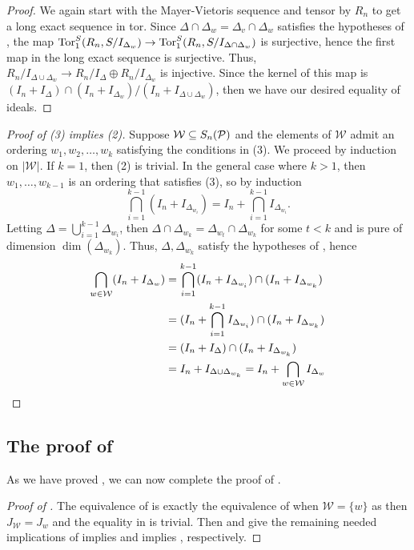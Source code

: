 \begin{proof}
    We again start with the Mayer-Vietoris sequence and tensor by $R_n$ to get a long exact sequence in tor.
    Since $\Delta\cap\Delta_w = \Delta_v\cap \Delta_w$ satisfies the hypotheses of , the map $\operatorname{Tor}_1^S(R_n,S/I_{\Delta_w})\to \operatorname{Tor}_1^S(R_n,S/I_{\Delta\cap\Delta_w})$ is surjective, hence the first map in the long exact sequence is surjective. Thus, $R_n/I_{\Delta\cup\Delta_w}\to R_n/I_\Delta \oplus R_n/I_{\Delta_w}$ is injective. Since the kernel of this map is $(I_n + I_\Delta)\cap (I_n+I_{\Delta_w})/(I_n + I_{\Delta\cup\Delta_w})$, then we have our desired equality of ideals.
\end{proof}



\begin{proof}[Proof of (3) implies (2)]
    Suppose $\mathcal{W} \subseteq S_n(\mathcal{P})$ and the elements of $\mathcal W$ admit an ordering $w_1,w_2,\dots, w_k$ satisfying the conditions in (3). We proceed by induction on $|\mathcal{W}|$. If $k=1$, then (2) is trivial. In the general case where $k>1$, then $w_1,\dots, w_{k-1}$ is an ordering that satisfies (3), so by induction
    \[
    \bigcap_{i=1}^{k-1} (I_n + I_{\Delta_{w_i}}) = I_n + \bigcap_{i=1}^{k-1}I_{\Delta_{w_i}}.
    \]
    Letting $\Delta = \bigcup_{i=1}^{k-1} \Delta_{w_i}$, then $\Delta\cap\Delta_{w_k} = \Delta_{w_t}\cap \Delta_{w_k}$ for some $t<k$ and is pure of dimension $\dim(\Delta_{w_k})$. Thus, $\Delta, \Delta_{w_k}$ satisfy the hypotheses of , hence 
    \begin{align*}
    \bigcap_{w\in \mathcal{W}}(I_n + I_{\Delta_{w}}) &= \bigcap_{i=1}^{k-1} (I_n + I_{\Delta_{w_i}})\cap(I_n + I_{\Delta_{w_k}})\\
    &= (I_n + \bigcap_{i=1}^{k-1}I_{\Delta_{w_i}})\cap(I_n + I_{\Delta_{w_k}})\\
    &= (I_n + I_{\Delta})\cap(I_n + I_{\Delta_{w_k}})\\
    &= I_n + I_{\Delta\cup\Delta_{w_k}} = I_n + \bigcap_{w\in \mathcal{W}}I_{\Delta_w}\qedhere
    \end{align*}
\end{proof}

\subsection{The proof of \texorpdfstring{}{Theorem A}}
As we have proved , we can now complete the proof of .
\begin{proof}[Proof of ]

    The equivalence of  is exactly the equivalence of  when $\mathcal{W} = \{w\}$ as then $J_\mathcal{W} = J_w$ and the equality in  is trivial.
    Then  and  give the remaining needed implications of  implies   and  implies , respectively. 
\end{proof}